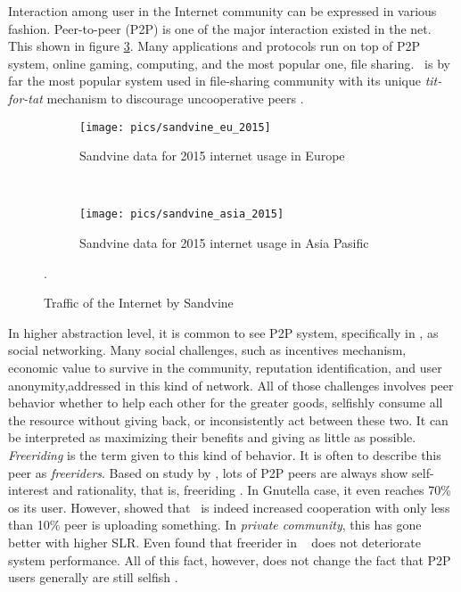 Interaction among user in the Internet community can be expressed in various fashion. Peer-to-peer (P2P) is one of the major interaction existed in the net. This shown in figure \ref{fig:usage}. Many applications and protocols run on top of P2P system, online gaming, computing, and the most popular one, file sharing. \bt~is by far the most popular system used in file-sharing community with its unique \textit{tit-for-tat} mechanism to discourage uncooperative peers \cite{2003:bittorrent:cohen}. 

\begin{figure}[h]
	\centering
	\begin{subfigure}[b]{0.8\textwidth}
		\texttt{[image: pics/sandvine\_eu\_2015]}
		\caption{Sandvine data for 2015 internet usage in Europe}
		\label{fig:usage1}
	\end{subfigure}\\
		\begin{subfigure}[b]{0.8\textwidth}
			\texttt{[image: pics/sandvine\_asia\_2015]}
			\caption{Sandvine data for 2015 internet usage in Asia Pasific}
			\label{fig:usage2}
		\end{subfigure}%
	\caption{Traffic of the Internet by Sandvine \cite{2015:internettraffic:sandvine}}.
	\label{fig:usage}
\end{figure}

In higher abstraction level, it is common to see P2P system, specifically in \bt, as social networking. Many social challenges, such as incentives mechanism, economic value to survive in the community, reputation identification, and user anonymity,addressed in this kind of network. All of those challenges involves peer behavior whether to help each other for the greater goods, selfishly consume all the resource without giving back, or inconsistently act between these two. It can be interpreted as maximizing their benefits and giving as little as possible. \textit{Freeriding} is the term given to this kind of behavior. It is often to describe this peer as \textit{freeriders}. Based on study by \citeauthor{2000:freeridegnutella:adar}, lots of P2P peers are always show self-interest and rationality, that is, freeriding \cite{2000:freeridegnutella:adar}. In Gnutella case, it even reaches 70\% os its user.  However, \citeauthor{2005:bittorrentcooperation:andrade} showed that \bt~is indeed increased cooperation with only less than 10\% peer is uploading something. In \textit{private community}, this has gone better with higher SLR. Even \citeauthor{2015:freeriderinbtcommunity:das} found that freerider in \bt~ does not deteriorate system performance\cite{2015:freeriderinbtcommunity:das}. All of this fact, however, does not change the fact that P2P users generally are still selfish \cite{2014:userbehaviourprivate:jia}. 

